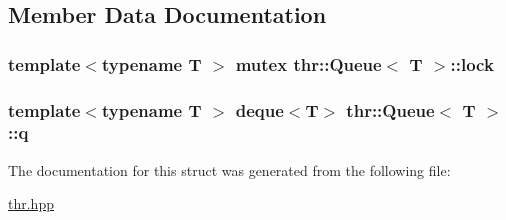 \subsection{Member Data Documentation}
\hypertarget{structthr_1_1_queue_abadc1f08bfec267edc24baaa442bb451}{
\subsubsection[{lock}]{\setlength{\rightskip}{0pt plus 5cm}template$<$typename T $>$ mutex {\bf thr\-::\-Queue}$<$ T $>$\-::{\bf lock}}}\label{structthr_1_1_queue_abadc1f08bfec267edc24baaa442bb451}
\hypertarget{structthr_1_1_queue_aecde97de4091b83a35dcf2ec42cdcd7b}{
\subsubsection[{q}]{\setlength{\rightskip}{0pt plus 5cm}template$<$typename T $>$ deque$<$T$>$ {\bf thr\-::\-Queue}$<$ T $>$\-::{\bf q}}}\label{structthr_1_1_queue_aecde97de4091b83a35dcf2ec42cdcd7b}


The documentation for this struct was generated from the following file\-:\begin{DoxyCompactItemize}
\item 
\hyperlink{thr_8hpp}{thr.\-hpp}\end{DoxyCompactItemize}
